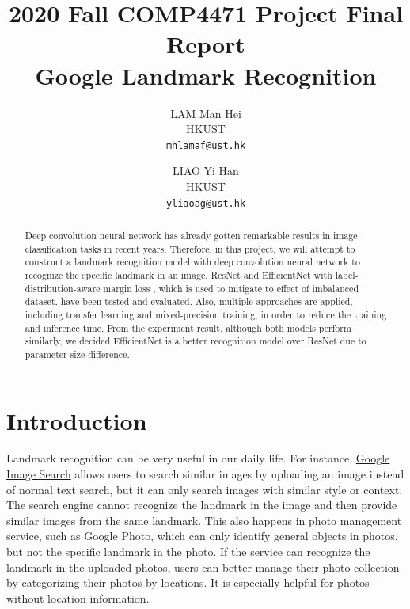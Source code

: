 \documentclass[10pt,twocolumn,letterpaper]{article}
\begin{document}
\title{2020 Fall COMP4471 Project Final Report\\Google Landmark Recognition}

\author{LAM Man Hei\\
HKUST\\
{\tt\small mhlamaf@ust.hk}
\and
LIAO Yi Han\\
HKUST\\
{\tt\small yliaoag@ust.hk}
}

\maketitle

\begin{abstract}
    Deep convolution neural network has already gotten remarkable results in image classification tasks in recent years. Therefore, in this project, we will attempt to construct a landmark recognition model with deep convolution neural network to recognize the specific landmark in an image. ResNet\cite{he_deep_2015} and EfficientNet\cite{tan_efficientnet_2020} with label-distribution-aware margin loss \cite{cao_learning_2019}, which is used to mitigate to effect of imbalanced dataset, have been tested and evaluated. Also, multiple approaches are applied, including transfer learning and mixed-precision training, in order to reduce the training and inference time. From the experiment result, although both models perform similarly, we decided EfficientNet is a better recognition model over ResNet due to parameter size difference.
\end{abstract}

\section{Introduction}

Landmark recognition can be very useful in our daily life. For instance, \href{https://www.google.com/imghp}{Google Image Search} allows users to search similar images by uploading an image instead of normal text search, but it can only search images with similar style or context. The search engine cannot recognize the landmark in the image and then provide similar images from the same landmark. This also happens in photo management service, such as Google Photo, which can only identify general objects in photos, but not the specific landmark in the photo. If the service can recognize the landmark in the uploaded photos, users can better manage their photo collection by categorizing their photos by locations. It is especially helpful for photos without location information.
\end{document}
